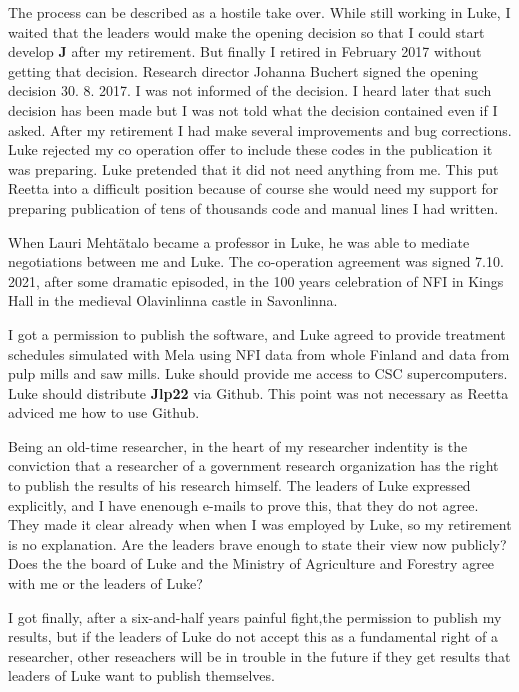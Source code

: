 The process can be described as a hostile take over. 
While still working in Luke, I waited that the leaders would make the opening decision 
so that I could start develop \textbf{J} after my retirement. But finally I retired in February 2017 without getting that decision. 
Research director Johanna Buchert signed the opening decision 30. 8. 2017. 
I was not informed of the decision. I heard later that such decision has been made but 
I was not told what the decision contained even if I asked. 
After my retirement I had make several improvements and bug corrections. 
Luke rejected my co operation offer to include these codes in the publication it was preparing. 
Luke pretended 
that it did not need anything from me. This put Reetta into a difficult position because 
of course she would need my support for preparing publication of tens of thousands 
code and manual lines I had written. 
 
When Lauri Mehtätalo became a professor in Luke, he was able to mediate negotiations between me and Luke. 
The co-operation agreement was signed 7.10. 2021, after some dramatic episoded, in the 100 years celebration of NFI in  Kings Hall 
in the medieval Olavinlinna castle in Savonlinna. 
 
I got a 
permission to publish the software, and Luke agreed to 
provide  treatment schedules simulated with Mela using NFI data from whole Finland and data 
from pulp mills and saw mills. 
Luke should provide me access to CSC supercomputers.  Luke should distribute \textbf{Jlp22} via Github.  This point 
was not necessary as Reetta adviced me how to use Github. 
 
Being an old-time researcher, in the heart of my researcher indentity 
is the conviction that a researcher of a government research organization 
has the right  to publish the results of his research himself. 
The leaders of Luke expressed explicitly, and I have 
enenough e-mails to prove this, that 
they do not agree. They made it clear already when when I was employed by Luke, so my retirement 
is no explanation. 
Are the leaders brave enough to state their view now publicly? 
Does the the board of Luke and the Ministry of Agriculture and Forestry 
agree with me or the leaders of Luke? 
 
I got finally, after a six-and-half years painful fight,the permission to publish my results, 
but if the leaders of Luke do not accept this as a fundamental right of a researcher, 
other reseachers will be in trouble in the future 
if they get results that leaders of Luke want to publish themselves. 
 
